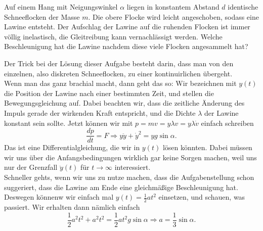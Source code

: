 \begin{Exercise}[label = avalance, origin = {4. Runde IPhO, 2008}, title = {Lawine}, difficulty = 4]
	Auf einem Hang mit Neigungswinkel $\alpha$ liegen in konstantem Abstand $d$ identische Schneeflocken der Masse $m$. Die obere Flocke wird leicht angeschoben,
sodass eine Lawine entsteht. Der Aufschlag der Lawine auf die ruhenden Flocken ist immer völlig
inelastisch, die Gleitreibung kann vernachlässigt werden. Welche Beschleunigung hat die Lawine
nachdem diese viele Flocken angesammelt hat?
\end{Exercise}
\begin{Answer}
	Der Trick bei der Lösung dieser Aufgabe besteht darin, dass man von den einzelnen, also diskreten Schneeflocken, zu einer kontinuirlichen übergeht.\\
	Wenn man das ganz brachial macht, dann geht das so:
	Wir bezeichnen mit $y\left(t\right)$ die Position der Lawine nach einer bestimmten Zeit, und stellen die Bewegungsgleichung auf. Dabei beachten wir, dass die zeitliche Änderung des Impuls gerade der wirkenden Kraft entspricht, und die Dichte $\lambda$ der Lawine konstant sein sollte. Jetzt können wir mit $p = mv = y \lambda v = y \lambda \dot{v}$ einfach schreiben
	\begin{equation}\label{avalanche:force}
		\frac{dp}{dt} = F \Rightarrow y \ddot{y} + \dot{y}^2 = yg \sin \alpha.
	\end{equation}
	Das ist eine Differentialgleichung, die wir in $y\left(t\right)$ lösen könnten. Dabei müssen wir uns über die Anfangsbedingungen wirklich gar keine Sorgen machen, weil uns nur der Grenzfall $\ddot{y}\left(t\right)$ für $t\rightarrow \infty$ interessiert. \\
	Schneller gehts, wenn wir uns zu nutze machen, dass die Aufgabenstellung schon suggeriert, dass die Lawine am Ende eine gleichmäßige Beschleunigung hat. Deswegen könnenw wir einfach mal $y\left(t\right) = \frac{1}{2}at^2$ einsetzen, und schauen, was passiert. Wir erhalten dann nämlich einfach
	\begin{equation}\label{avalance:acc}
	\boxed{
		\frac{1}{2} a^2 t^2 + a^2 t^2 = \frac{1}{2}at^2g\sin \alpha \Rightarrow a = \frac{1}{3}\sin \alpha.}
	\end{equation}
\end{Answer}